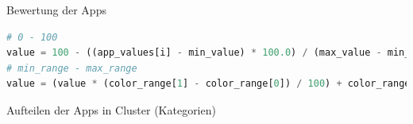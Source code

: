 \documentclass[compress,t]{beamer}
\begin{document}
\begin{frame}[fragile]{Bewertung der Apps}
    \begin{lstlisting}[language=Python]
# 0 - 100
value = 100 - ((app_values[i] - min_value) * 100.0) / (max_value - min_value)
# min_range - max_range
value = (value * (color_range[1] - color_range[0]) / 100) + color_range[0]
    \end{lstlisting}

\end{frame}

\begin{frame}
    Aufteilen der Apps in Cluster (Kategorien)
\end{frame}
\end{document}
